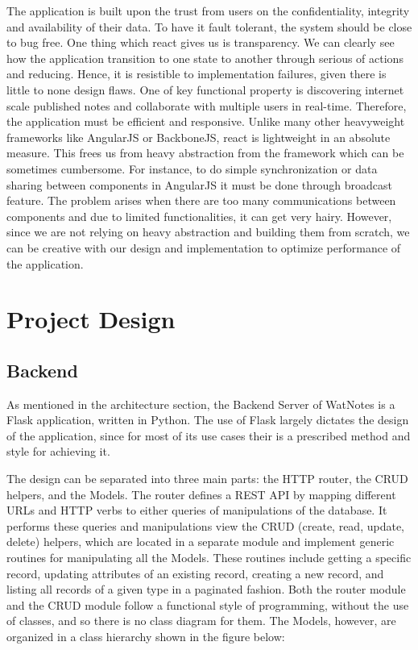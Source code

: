 \documentclass[12pt]{article}
\begin{document}
  The application is built upon the trust from users on the confidentiality, integrity and availability of their data. To have it fault tolerant, the system should be close to bug free. One thing which react gives us is transparency. We can clearly see how the application transition to one state to another through serious of actions and reducing. Hence, it is resistible to implementation failures, given there is little to none design flaws. One of key functional property is discovering internet scale published notes and collaborate with multiple users in real-time. Therefore, the application must be efficient and responsive. Unlike many other heavyweight frameworks like AngularJS or BackboneJS, react is lightweight in an absolute measure. This frees us from heavy abstraction from the framework which can be sometimes cumbersome. For instance, to do simple synchronization or data sharing between components in AngularJS it must be done through broadcast feature. The problem arises when there are too many communications between components and due to limited functionalities, it can get very hairy. However, since we are not relying on heavy abstraction and building them from scratch, we can be  creative with our design and implementation to optimize performance of the application. \\


  \newpage

  \section{Project Design}
  \subsection{Backend}
    As mentioned in the architecture section, the Backend Server of WatNotes is
    a Flask application, written in Python. The use of Flask largely dictates
    the design of the application, since for most of its use cases their is a
    prescribed method and style for achieving it.

    The design can be separated into three main parts: the HTTP router, the CRUD
    helpers, and the Models. The router defines a REST API by mapping different
    URLs and HTTP verbs to either queries of manipulations of the database. It
    performs these queries and manipulations view the CRUD (create, read,
    update, delete) helpers, which are located in a separate module and
    implement generic routines for manipulating all the Models. These routines
    include getting a specific record, updating attributes of an existing
    record, creating a new record, and listing all records of a given type in a
    paginated fashion. Both the router module and the CRUD module follow a
    functional style of programming, without the use of classes, and so there is
    no class diagram for them. The Models, however, are organized in a class
    hierarchy shown in the figure below:
\end{document}
